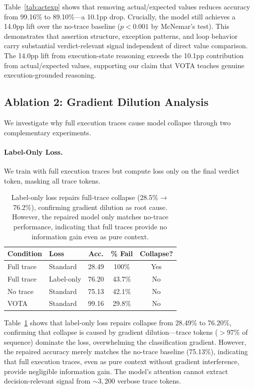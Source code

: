 \documentclass[11pt,a4paper]{article}
\begin{document}
Table~\ref{tab:actexp} shows that removing actual/expected values reduces accuracy from 99.16\% to 89.10\%---a 10.1pp drop. Crucially, the model still achieves a 14.0pp lift over the no-trace baseline ($p < 0.001$ by McNemar's test). This demonstrates that assertion structure, exception patterns, and loop behavior carry substantial verdict-relevant signal independent of direct value comparison. The 14.0pp lift from execution-state reasoning exceeds the 10.1pp contribution from actual/expected values, supporting our claim that VOTA teaches genuine execution-grounded reasoning.

\subsection{Ablation 2: Gradient Dilution Analysis}
\label{sec:dilution}

We investigate why full execution traces cause model collapse through two complementary experiments.

\paragraph{Label-Only Loss.} We train with full execution traces but compute loss only on the final verdict token, masking all trace tokens.

\begin{table}[t]
\centering
\small
\begin{tabular}{llccc}
\toprule
\textbf{Condition} & \textbf{Loss} & \textbf{Acc.} & \textbf{\% Fail} & \textbf{Collapse?} \\
\midrule
Full trace & Standard & 28.49 & 100\% & Yes \\
Full trace & Label-only & 76.20 & 43.7\% & No \\
No trace & Standard & 75.13 & 42.1\% & No \\
VOTA & Standard & 99.16 & 29.8\% & No \\
\bottomrule
\end{tabular}
\caption{Label-only loss repairs full-trace collapse (28.5\%$\to$76.2\%), confirming gradient dilution as root cause. However, the repaired model only matches no-trace performance, indicating that full traces provide no information gain even as pure context.}
\label{tab:labelonly}
\end{table}

Table~\ref{tab:labelonly} shows that label-only loss repairs collapse from 28.49\% to 76.20\%, confirming that collapse is caused by gradient dilution---trace tokens ($>$97\% of sequence) dominate the loss, overwhelming the classification gradient. However, the repaired accuracy merely matches the no-trace baseline (75.13\%), indicating that full execution traces, even as pure context without gradient interference, provide negligible information gain. The model's attention cannot extract decision-relevant signal from ${\sim}3{,}200$ verbose trace tokens.
\end{document}
